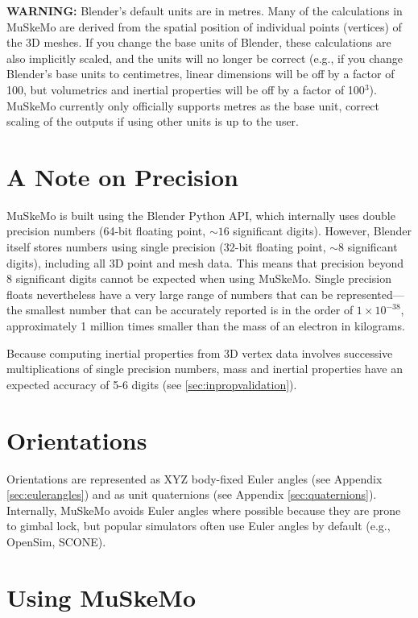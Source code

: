 \documentclass{article}
\begin{document}
\textbf{WARNING:} Blender's default units are in metres. Many of the calculations in MuSkeMo are derived from the spatial position of individual points (vertices) of the 3D meshes. If you change the base units of Blender, these calculations are also implicitly scaled, and the units will no longer be correct (e.g., if you change Blender’s base units to centimetres, linear dimensions will be off by a factor of 100, but volumetrics and inertial properties will be off by a factor of 100\(^3\)). MuSkeMo currently only officially supports metres as the base unit, correct scaling of the outputs if using other units is up to the user.

\section{A Note on Precision}
\label{sec:precision}

MuSkeMo is built using the Blender Python API, which internally uses double precision numbers (64-bit floating point, \(\sim16\) significant digits). However, Blender itself stores numbers using single precision (32-bit floating point, \(\sim8\) significant digits), including all 3D point and mesh data. This means that precision beyond 8 significant digits cannot be expected when using MuSkeMo. Single precision floats nevertheless have a very large range of numbers that can be represented—the smallest number that can be accurately reported is in the order of \(1\times10^{-38}\), approximately 1 million times smaller than the mass of an electron in kilograms.

Because computing inertial properties from 3D vertex data involves successive multiplications of single precision numbers, mass and inertial properties have an expected accuracy of 5-6 digits (see \ref{sec:inpropvalidation}).

\section{Orientations}

Orientations are represented as XYZ body-fixed Euler angles (see Appendix \ref{sec:eulerangles}) and as unit quaternions (see Appendix \ref{sec:quaternions}). Internally, MuSkeMo avoids Euler angles where possible because they are prone to gimbal lock, but popular simulators often use Euler angles by default (e.g., OpenSim, SCONE).


\section{Using MuSkeMo}
\end{document}
